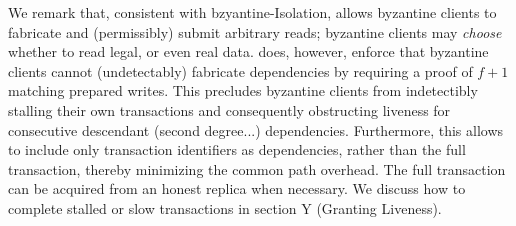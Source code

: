 We remark that, consistent with bzyantine-Isolation, \sys allows byzantine clients to fabricate and (permissibly) submit arbitrary reads; byzantine clients may \textit{choose} whether to read legal, or even real data.  \sys does, however, enforce that byzantine clients cannot (undetectably) fabricate dependencies by requiring a proof of $f+1$ matching prepared writes. This precludes byzantine clients from indetectibly stalling their own transactions and consequently obstructing liveness for consecutive descendant (second degree...) dependencies.
Furthermore, this allows \sys to include only transaction identifiers as dependencies, rather than the full transaction, thereby minimizing the common path overhead. The full transaction can be acquired from an honest replica when necessary. We discuss how to complete stalled or slow transactions in section Y (Granting Liveness).




